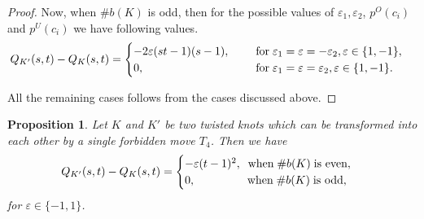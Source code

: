 \documentclass[10pt,a4paper,reqno]{amsart}
\newtheorem{proposition}[theorem]{Proposition}
\theoremstyle{definition}
\theoremstyle{remark}
\begin{document}
\begin{proof}
		
		Now, when $\# b(K)$ is odd, then for the possible values of $\varepsilon_{1}, \varepsilon_{2}$, $p^{O}(c_i)$ and  $p^{U}(c_i)$ we have following values.
		$$Q_{K'}(s,t)-Q_{K}(s,t)=\begin{cases}
			-2\varepsilon(st-1)(s-1), \quad \quad \; \text{for} \; \varepsilon_{1}=\varepsilon=-\varepsilon_{2}, \varepsilon \in \{1,-1\},\\
			  0, \hspace{3.1cm}  \quad\text{for} \; \varepsilon_{1}=\varepsilon=\varepsilon_{2}, \varepsilon \in \{1,-1\}.
		\end{cases}	$$
		
		All the remaining cases follows from the cases discussed above.
	\end{proof}
	\begin{proposition}\label{pr:for4}
		Let $K$ and $K'$ be two twisted knots which can be transformed into each
		other by a single forbidden move $T_4$. Then we have
		\[Q_{K'}(s,t)-Q_{K}(s,t) =
		\begin{cases}
			-\varepsilon(t-1)^2, \; \; \text{when}\; \#b(K)\; \text{is even},\\
			0, \hspace{1.6cm} \text{when}\; \#b(K)\;  \text{is odd},
		\end{cases}\] 
		for $\varepsilon \in \{-1,1\}$.
	\end{proposition}
	
\end{document}
